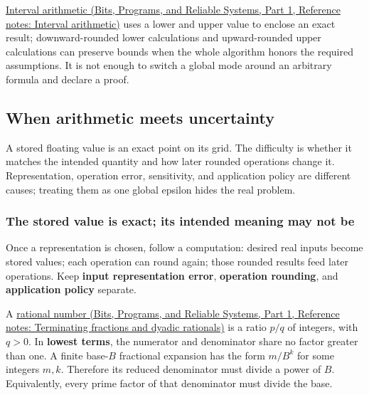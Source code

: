 \href{../01-Bits-Programs-and-Reliable-Systems-P01/main.pdf\#nameddest=appendix-1823a14330cb}{Interval arithmetic (Bits, Programs, and Reliable Systems, Part 1, Reference notes: Interval arithmetic)} uses a lower and upper value to enclose an exact result; downward-rounded lower calculations and upward-rounded upper calculations can preserve bounds when the whole algorithm honors the required assumptions. It is not enough to switch a global mode around an arbitrary formula and declare a proof.

\subsection{When arithmetic meets uncertainty}\label{05-engine-i-ch001-when-arithmetic-meets-uncertainty}

\hypertarget{05-engine-i-ch001-when-arithmetic-meets-uncertainty}{}

A stored floating value is an exact point on its grid. The difficulty is whether it matches the intended quantity and how later rounded operations change it. Representation, operation error, sensitivity, and application policy are different causes; treating them as one global epsilon hides the real problem.

\subsubsection{The stored value is exact; its intended meaning may not be}\label{05-engine-i-ch001-the-stored-value-is-exact-its-intended-meaning-may-not-be}

\hypertarget{05-engine-i-ch001-the-stored-value-is-exact-its-intended-meaning-may-not-be}{}

Once a representation is chosen, follow a computation: desired real inputs become stored values; each operation can round again; those rounded results feed later operations. Keep \textbf{input representation error}, \textbf{operation rounding}, and \textbf{application policy} separate.

A \href{../01-Bits-Programs-and-Reliable-Systems-P01/main.pdf\#nameddest=appendix-2a2f1b74bdd3}{rational number (Bits, Programs, and Reliable Systems, Part 1, Reference notes: Terminating fractions and dyadic rationals)} is a ratio \(p/q\) of integers, with \(q>0\). In \textbf{lowest terms}, the numerator and denominator share no factor greater than one. A finite base-\(B\) fractional expansion has the form \(m/B^k\) for some integers \(m,k\). Therefore its reduced denominator must divide a power of \(B\). Equivalently, every prime factor of that denominator must divide the base.

